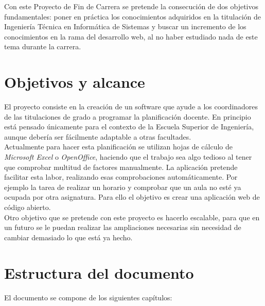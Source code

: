 

Con este Proyecto de Fin de Carrera se pretende la consecución de dos objetivos fundamentales: poner en práctica los conocimientos adquiridos en la titulación de Ingeniería Técnica en Informática de Sistemas y buscar un incremento de los conocimientos en la rama del desarrollo web, al no haber estudiado nada de este tema durante la carrera. \\

\section{Objetivos y alcance}

El proyecto consiste en la creación de un software que ayude a los coordinadores de las titulaciones de grado a programar la planificación docente. En principio está pensado únicamente para el contexto de la Escuela Superior de Ingeniería, aunque debería ser fácilmente adaptable a otras facultades. \\

Actualmente para hacer esta planificación se utilizan hojas de cálculo de {\em Microsoft Excel} o {\em OpenOffice}, haciendo que el trabajo sea algo tedioso al tener que comprobar multitud de factores manualmente. La aplicación pretende facilitar esta labor, realizando esas comprobaciones automáticamente. Por ejemplo la tarea de realizar un horario y comprobar que un aula no esté ya ocupada por otra asignatura. Para ello el objetivo es crear una aplicación web de código abierto.\\

Otro objetivo que se pretende con este proyecto es hacerlo escalable, para que en un futuro se le puedan realizar las ampliaciones necesarias sin necesidad de cambiar demasiado lo que está ya hecho.

\section{Estructura del documento}

El documento se compone de los siguientes capítulos:

